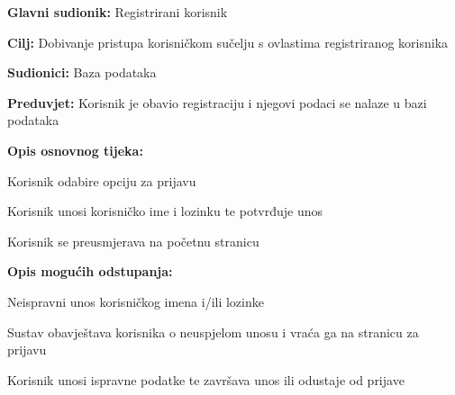 \noindent {}
\begin{packed_item}

	\item \textbf{Glavni sudionik: }Registrirani korisnik
	\item  \textbf{Cilj:} Dobivanje pristupa korisničkom sučelju s ovlastima registriranog korisnika
	\item  \textbf{Sudionici:} Baza podataka
	\item  \textbf{Preduvjet:} Korisnik je obavio registraciju i njegovi podaci se nalaze u bazi podataka
	\item  \textbf{Opis osnovnog tijeka:}

	\item[] \begin{packed_enum}

		\item Korisnik odabire opciju za prijavu
		\item Korisnik unosi korisničko ime i lozinku te potvrđuje unos
		\item Korisnik se preusmjerava na početnu stranicu
	\end{packed_enum}

	\item  \textbf{Opis mogućih odstupanja:}

	\item[] \begin{packed_item}

		\item[2.a] Neispravni unos korisničkog imena i/ili lozinke
		\item[] \begin{packed_enum}

			\item Sustav obavještava korisnika o neuspjelom unosu i vraća ga na stranicu za prijavu
			\item Korisnik unosi ispravne podatke te završava unos ili odustaje od prijave

		\end{packed_enum}
	\end{packed_item}
\end{packed_item}

